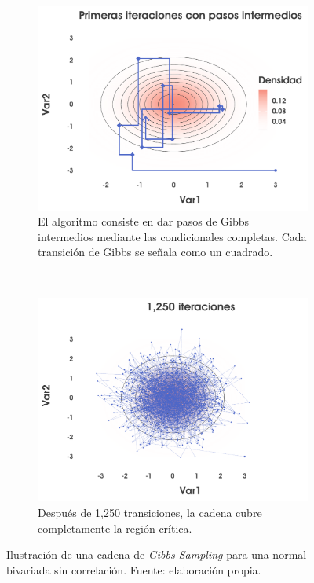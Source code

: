 \begin{figure}[h]
    \centering
    \begin{subfigure}{0.35\textwidth}
        \includegraphics[width=\textwidth]{Figs/Bayes/Ejemplo_GS_A}
        \caption{El algoritmo consiste en dar pasos de Gibbs intermedios mediante las condicionales completas. Cada transición de Gibbs se señala como un cuadrado.}
    \end{subfigure}
    ~ 
    \begin{subfigure}{0.35\textwidth}
        \includegraphics[width=\textwidth]{Figs/Bayes/Ejemplo_GS_B}
        \caption{Después de 1,250 transiciones, la cadena cubre completamente la región crítica.}
    \end{subfigure}
     \caption{Ilustración de una cadena de \textit{Gibbs Sampling} para una normal bivariada sin correlación. Fuente: elaboración propia.}\label{fig:GS_indep}
\end{figure}
 
